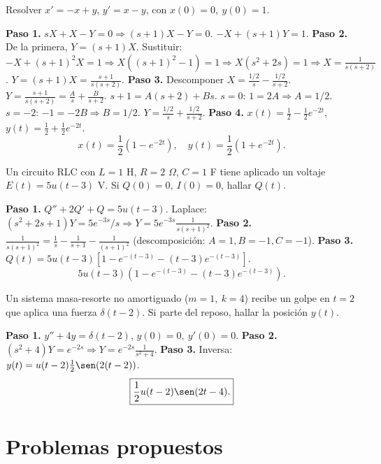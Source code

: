 \begin{prob}
Resolver $x' = -x + y$, $y' = x - y$, con $x(0)=0,\ y(0)=1$.
\begin{myproof}
\textbf{Paso 1.} $sX + X - Y = 0 \Rightarrow (s+1)X - Y = 0$. $-X + (s+1)Y = 1$.
\textbf{Paso 2.} De la primera, $Y=(s+1)X$. Sustituir: $-X + (s+1)^2 X = 1 \Rightarrow X((s+1)^2-1)=1 \Rightarrow X(s^2+2s)=1 \Rightarrow X = \frac{1}{s(s+2)}$.
$Y = (s+1)X = \frac{s+1}{s(s+2)}$.
\textbf{Paso 3.} Descomponer $X = \frac{1/2}{s} - \frac{1/2}{s+2}$. $Y = \frac{s+1}{s(s+2)} = \frac{A}{s}+\frac{B}{s+2}$. $s+1 = A(s+2)+B s$. $s=0$: $1=2A\Rightarrow A=1/2$. $s=-2$: $-1=-2B\Rightarrow B=1/2$. $Y = \frac{1/2}{s}+\frac{1/2}{s+2}$.
\textbf{Paso 4.} $x(t)=\frac{1}{2} - \frac{1}{2}e^{-2t}$, $y(t)=\frac{1}{2}+\frac{1}{2}e^{-2t}$.
\[
\boxed{x(t)=\frac{1}{2}(1-e^{-2t}),\quad y(t)=\frac{1}{2}(1+e^{-2t}).}
\]
\end{myproof}
\end{prob}

\begin{prob}
Un circuito RLC con $L=1$ H, $R=2$ $\Omega$, $C=1$ F tiene aplicado un voltaje $E(t)=5u(t-3)$ V. Si $Q(0)=0,\ I(0)=0$, hallar $Q(t)$.
\begin{myproof}
\textbf{Paso 1.} $Q'' + 2Q' + Q = 5u(t-3)$. Laplace: $(s^2+2s+1)Y = 5e^{-3s}/s \Rightarrow Y = 5e^{-3s}\frac{1}{s(s+1)^2}$.
\textbf{Paso 2.} $\frac{1}{s(s+1)^2} = \frac{1}{s} - \frac{1}{s+1} - \frac{1}{(s+1)^2}$ (descomposición: $A=1, B=-1, C=-1$).
\textbf{Paso 3.} $Q(t)=5u(t-3)[1 - e^{-(t-3)} - (t-3)e^{-(t-3)}]$.
\[
\boxed{5u(t-3)\left(1 - e^{-(t-3)} - (t-3)e^{-(t-3)}\right).}
\]
\end{myproof}
\end{prob}

\begin{prob}
Un sistema masa-resorte no amortiguado ($m=1,\ k=4$) recibe un golpe en $t=2$ que aplica una fuerza $\delta(t-2)$. Si parte del reposo, hallar la posición $y(t)$.
\begin{myproof}
\textbf{Paso 1.} $y'' + 4y = \delta(t-2)$, $y(0)=0,\ y'(0)=0$.
\textbf{Paso 2.} $(s^2+4)Y = e^{-2s} \Rightarrow Y = e^{-2s}\frac{1}{s^2+4}$.
\textbf{Paso 3.} Inversa: $y(t)=u(t-2)\frac{1}{2}\sen(2(t-2))$.
\[
\boxed{\frac{1}{2}u(t-2)\sen(2t-4).}
\]
\end{myproof}
\end{prob}

\section{Problemas propuestos}

